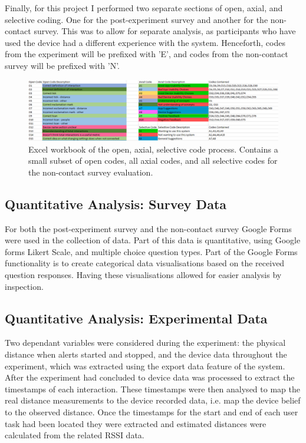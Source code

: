 \documentclass{l4proj}
\begin{document}
Finally, for this project I performed two separate sections of open, axial, and selective coding. One for the post-experiment survey and another for the non-contact survey. This was to allow for separate analysis, as participants who have used the device had a different experience with the system. Henceforth, codes from the experiment will be prefixed with 'E', and codes from the non-contact survey will be prefixed with 'N'.

\begin{figure}[!htb]
    \centering
    \includegraphics[width=1.0\linewidth]{images/codes.png}

    \caption{ Excel workbook of the open, axial, selective code process. Contains a small subset of open codes, all axial codes, and all selective codes for the non-contact survey evaluation. }

    \label{fig:oas_codes}
\end{figure}

\subsection{Quantitative Analysis: Survey Data}

For both the post-experiment survey and the non-contact survey Google Forms were used in the collection of data. Part of this data is quantitative, using Google forms Likert Scale, and multiple choice question types. Part of the Google Forms functionality is to create categorical data visualisations based on the received question responses. Having these visualisations allowed for easier analysis by inspection.

\subsection{Quantitative Analysis: Experimental Data}

Two dependant variables were considered during the experiment: the physical distance when alerts started and stopped, and the device data throughout the experiment, which was extracted using the export data feature of the system. After the experiment had concluded to device data was processed to extract the timestamps of each interaction. These timestamps were then analysed to map the real distance measurements to the device recorded data, i.e. map the device belief to the observed distance. Once the timestamps for the start and end of each user task had been located they were extracted and estimated distances were calculated from the related RSSI data.
\end{document}

